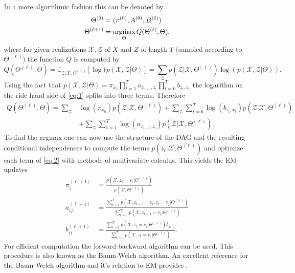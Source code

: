 \documentclass{article}
\begin{document}
In a more algorithmic fashion this can be denoted by
\begin{align}
\Theta^{(0)} & = (\pi^{(0)},A^{(0)},B^{(0)}) \\
\Theta^{(\ell+1)} &= \underset{\Theta}{\textup{arg\. max}} \, Q(\Theta^{(\ell)},\Theta), 
\end{align}
where for given realizations $\mathcal{X},\mathcal{Z}$ of $X$ and $Z$ of length $T$ (sampled according to $\Theta^{(\ell)}$) the function $Q$ is computed by
\begin{equation}
\label{eq:1}
Q(\Theta^{(\ell)},\Theta) = \mathbb{E}_{\mathcal{Z}|\mathcal{X},\Theta^{(\ell)}} \left[ \log(p(\mathcal{X},\mathcal{Z}|\Theta) \right] = \sum_\mathcal{Z} p(\mathcal{Z}|\mathcal{X},\Theta^{(\ell)}) \log(p(\mathcal{X},\mathcal{Z}|\Theta)).
\end{equation}
Using the fact that $p(\mathcal{X},\mathcal{Z}|\Theta)
=
\pi_{x_0} \prod_{t=1}^T a_{z_{t-1},z_t} \prod_{t=0}^T b_{z_{t},x_t} $ the logarithm on the ride hand side of \eqref{eq:1} splits into three terms. Therefore
\begin{align}
\label{eq:2}
Q(\Theta^{(\ell)},\Theta) = \sum_\mathcal{Z} & \log(\pi_{x_0}) p(\mathcal{Z}|\mathcal{X},\Theta^{(\ell)}) 
+
\sum_\mathcal{Z} \sum_{t=0}^T \log(b_{z_{t},x_t}) p(\mathcal{Z}|\mathcal{X},\Theta^{(\ell)})\\ 
&+
\sum_\mathcal{Z} \sum_{t=1}^T \log(a_{z_{t-1},z_t}) p(\mathcal{Z}|\mathcal{X},\Theta^{(\ell)}). 
\end{align}
To find the argmax one can now use the structure of the DAG and the resulting conditional independences to compute the terms $p(z_t|\mathcal{X},\Theta^{(\ell)})$ and optimize each term of \eqref{eq:2} with methods of multivariate calculus. This yields the EM-updates
\begin{align}
\pi^{(\ell+1)}_i &= \frac{p(\mathcal{X},z_0=e_i | \Theta^{(\ell)})}{p(\mathcal{X},\Theta^{(\ell)})} \\
a^{(\ell+1)}_{ij} &= \frac{\sum_{t=1}^T p(\mathcal{X},z_{t-1}=e_i,z_t=e_j | \Theta^{(\ell)})}{\sum_{t=1}^T p(\mathcal{X},z_{t-1}=e_i| \Theta^{(\ell)})} \\
b^{(\ell+1)}_{ij} &= \frac{\sum_{t=1}^T p(\mathcal{X},z_t=e_i | \Theta^{(\ell)}) \delta_{x_t,j}}{\sum_{t=1}^T p(\mathcal{X},z_t=e_i| \Theta^{(\ell)})} .
\end{align}
For efficient computation the forward-backward algorithm can be used. This procedure is also known as the Baum-Welch algorithm. An excellent reference for the Baum-Welch algorithm and it's relation to EM provides \cite{baumwelch}.
\end{document}
